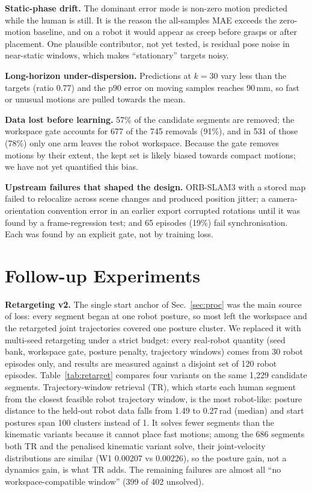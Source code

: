 \documentclass[conference,10pt]{IEEEtran}
\newcommand{\mm}{\,mm\xspace}
\begin{document}
\textbf{Static-phase drift.} The dominant error mode is non-zero motion predicted while the human is still. It is the reason
the all-samples MAE exceeds the zero-motion baseline, and on a robot it would appear as creep before grasps or after placement.
One plausible contributor, not yet tested, is residual pose noise in near-static windows, which makes ``stationary'' targets noisy.

\textbf{Long-horizon under-dispersion.} Predictions at $k{=}30$ vary less than the targets (ratio 0.77) and the p90 error on
moving samples reaches 90\mm, so fast or unusual motions are pulled towards the mean.

\textbf{Data lost before learning.} 57\% of the candidate segments are removed; the workspace gate accounts for 677 of the 745
removals (91\%), and in 531 of those (78\%) only one arm leaves the robot workspace. Because the gate removes motions by
their extent, the kept set is likely biased towards compact motions; we have not yet quantified this bias.

\textbf{Upstream failures that shaped the design.} ORB-SLAM3 with a stored map failed to relocalize across scene changes and
produced position jitter; a camera-orientation convention error in an earlier export corrupted rotations until it was found by a frame-regression test; and 65 episodes (19\%) fail synchronisation. Each was found by an explicit gate,
not by training loss.

\section{Follow-up Experiments}\label{sec:follow}
\textbf{Retargeting v2.} The single start anchor of Sec.~\ref{sec:proc} was the main source of loss: every segment began at
one robot posture, so most left the workspace and the retargeted joint trajectories covered one posture cluster. We replaced
it with multi-seed retargeting under a strict budget: every real-robot quantity (seed bank, workspace gate, posture
penalty, trajectory windows) comes from 30 robot episodes only, and results are measured against a disjoint set of 120
robot episodes. Table~\ref{tab:retarget} compares four variants on the same 1{,}229 candidate segments. Trajectory-window
retrieval (TR), which starts each human segment from the closest feasible robot trajectory window, is the most
robot-like: posture distance to the held-out robot data falls from 1.49 to 0.27\,rad (median) and start postures span 100
clusters instead of 1. It solves fewer segments than the kinematic variants because it cannot place fast motions; among the
686 segments both TR and the penalised kinematic variant solve, their joint-velocity distributions are similar (W1 0.00207
vs 0.00226), so the posture gain, not a dynamics gain, is what TR adds. The remaining failures are almost all ``no
workspace-compatible window'' (399 of 402 unsolved).
\end{document}
